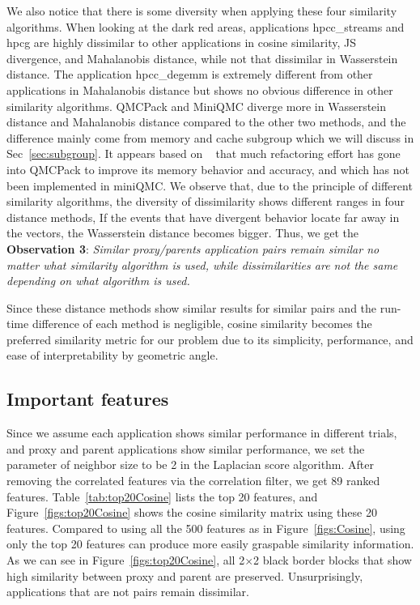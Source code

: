 We also notice that there is some diversity when applying these four similarity algorithms. When looking at the dark red areas, applications hpcc\_streams and hpcg are highly dissimilar to other applications in cosine similarity, JS divergence, and Mahalanobis distance, while not that dissimilar in Wasserstein distance. The application hpcc\_degemm is extremely different from other applications in Mahalanobis distance but shows no obvious difference in other similarity algorithms. QMCPack and MiniQMC diverge more in Wasserstein distance and Mahalanobis distance compared to the other two methods, and the difference mainly come from memory and cache subgroup which we will discuss in Sec~\ref{sec:subgroup}. It appears based on ~\cite{qmcpack} that much refactoring effort has gone into QMCPack to improve its memory
behavior and accuracy, and which has not been implemented in miniQMC. We observe that, due to the principle of different similarity algorithms, the diversity of dissimilarity shows different ranges in four distance methods, \eg If the events that have divergent behavior locate far away in the vectors, the Wasserstein distance becomes bigger. Thus, we get the \textbf{Observation 3}: \textit{Similar proxy/parents application pairs remain similar no matter what similarity algorithm is used, while dissimilarities are not the same depending on what algorithm is used.}

Since these distance methods show similar results for similar pairs and the run-time difference of each method is negligible, cosine similarity becomes the preferred similarity metric for our problem due to its simplicity, performance, and ease of interpretability by geometric angle.

\subsection{Important features}
Since we assume each application shows similar performance in different trials, and proxy and parent applications show similar performance, we set the parameter of neighbor size to be 2 in the Laplacian score algorithm. After removing the correlated features via the correlation filter, we get 89 ranked features. Table~\ref{tab:top20Cosine} lists the top 20 features, and Figure~\ref{figs:top20Cosine}  shows the cosine similarity matrix using these 20 features. Compared to using all the 500 features as in Figure~\ref{figs:Cosine}, using only the top 20 features can produce more easily graspable similarity information. As we can see in Figure~\ref{figs:top20Cosine}, all 2$\times$2 black border blocks that show high similarity between proxy and parent are preserved. Unsurprisingly, applications that are not pairs remain dissimilar.%

